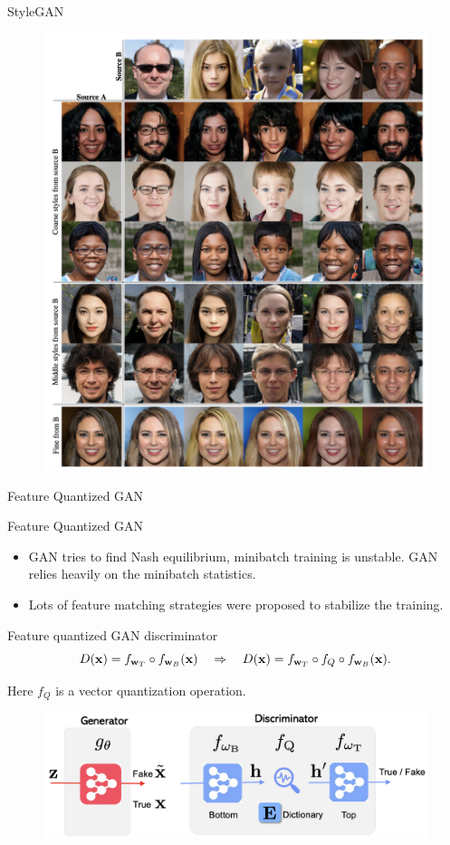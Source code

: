 \begin{frame}{StyleGAN}
		\begin{figure}
			\centering
			\includegraphics[width=0.6\linewidth]{figs/stylegan_mix}
		\end{figure}

\end{frame}
\begin{frame}{Feature Quantized GAN}
\end{frame}
\begin{frame}{Feature Quantized GAN}
	\begin{itemize}
		\item GAN tries to find Nash equilibrium, minibatch training is unstable. GAN relies heavily on the minibatch statistics.
		\item Lots of feature matching strategies were proposed to stabilize the training. 
	\end{itemize}
	\begin{block}{Feature quantized GAN discriminator}
		\[
			D(\mathbf{x}) = f_{\mathbf{w}_T} \circ f_{\mathbf{w}_B}(\mathbf{x}) \quad \Rightarrow \quad D(\mathbf{x}) = f_{\mathbf{w}_T} \circ f_Q \circ f_{\mathbf{w}_B}(\mathbf{x}). 
		\]
	\end{block}
	Here $f_Q$ is a vector quantization operation.
	\begin{figure}
		\centering
		\includegraphics[width=0.7\linewidth]{figs/fqgan}
	\end{figure}
\end{frame}
